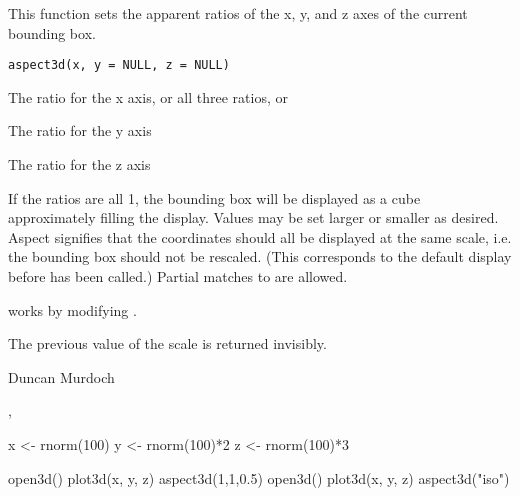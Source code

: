 \documentclass{article}
\begin{document}
\begin{Description}\relax
This function sets the apparent ratios of the x, y, and z axes
of the current bounding box.
\end{Description}
\begin{Usage}
\begin{verbatim}
aspect3d(x, y = NULL, z = NULL)
\end{verbatim}
\end{Usage}
\begin{Arguments}
\begin{ldescription}
\item[\code{x}] The ratio for the x axis, or all three ratios, or  
\item[\code{y}] The ratio for the y axis 
\item[\code{z}] The ratio for the z axis 
\end{ldescription}
\end{Arguments}
\begin{Details}\relax
If the ratios are all 1, the bounding box will be displayed as a cube approximately filling the display.
Values may be set larger or smaller as desired.  Aspect  signifies that the
coordinates should all be displayed at the same scale, i.e. the bounding box should not be
rescaled.  (This corresponds to the default display before  has been called.)
Partial matches to  are allowed.

 works by modifying .
\end{Details}
\begin{Value}
The previous value of the scale is returned invisibly.
\end{Value}
\begin{Author}\relax
Duncan Murdoch
\end{Author}
\begin{SeeAlso}\relax
{}, 
\end{SeeAlso}
\begin{Examples}
\begin{ExampleCode}
  x <- rnorm(100)
  y <- rnorm(100)*2
  z <- rnorm(100)*3
  
  open3d()
  plot3d(x, y, z)
  aspect3d(1,1,0.5)
  open3d()
  plot3d(x, y, z)
  aspect3d("iso")
\end{ExampleCode}
\end{Examples}
\end{document}
